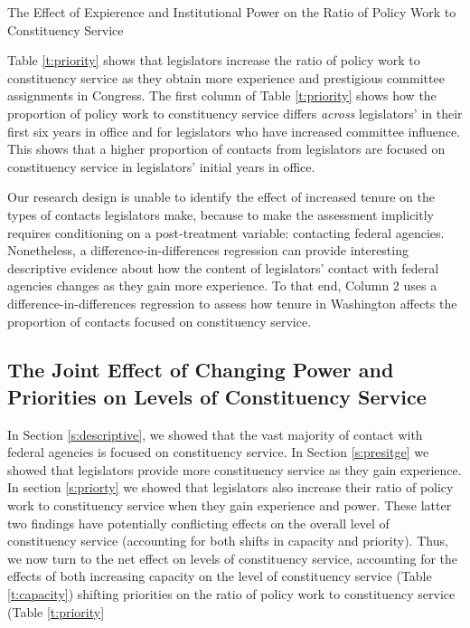 \documentclass[12pt]{article}
\begin{document}
\begin{table}
\begin{center}
\begin{minipage}{\textwidth}
\caption{The Effect of Expierence and Institutional Power on the Ratio of Policy Work to Constituency Service} \label{t:priority}
\centering

\end{minipage}
\end{center}
\end{table}


Table \ref{t:priority} shows that legislators increase the ratio of policy work to constituency service as they obtain more experience and prestigious committee assignments in Congress. The first column of Table \ref{t:priority} shows how the proportion of policy work to constituency service differs \textit{across} legislators' in their first six years in office and for legislators who have increased committee influence. This shows that a higher proportion of contacts from legislators are focused on constituency service in legislators' initial years in office.

Our research design is unable to identify the effect of increased tenure on the types of contacts legislators make, because to make the assessment implicitly requires conditioning on a post-treatment variable: contacting federal agencies. Nonetheless, a difference-in-differences regression can provide interesting descriptive evidence about how the content of legislators' contact with federal agencies changes as they gain more experience. To that end, Column 2 uses a difference-in-differences regression to assess how tenure in Washington affects the proportion of contacts focused on constituency service. 


\subsection{The Joint Effect of Changing Power and Priorities on Levels of Constituency Service}\label{s:joint} 

In Section \ref{s:descriptive}, we showed that the vast majority of contact with federal agencies is focused on constituency service. In Section \ref{s:presitge} we showed that legislators provide more constituency service as they gain experience. In section \ref{s:priorty} we showed that legislators also increase their ratio of policy work to constituency service when they gain experience and power. These latter two findings have potentially conflicting effects on the overall level of constituency service (accounting for both shifts in capacity and priority). Thus, we now turn to the net effect on levels of constituency service, accounting for the effects of both increasing capacity on the level of constituency service (Table \ref{t:capacity}) shifting priorities on the ratio of policy work to constituency service (Table \ref{t:priority}
\end{document}
